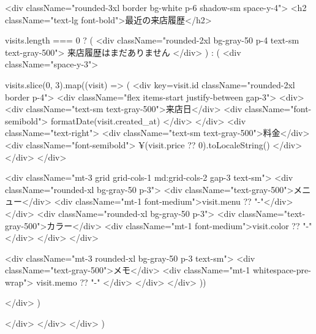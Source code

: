 {        <div className="rounded-3xl border bg-white p-6 shadow-sm space-y-4">
          <h2 className="text-lg font-bold">最近の来店履歴</h2>

          {visits.length === 0 ? (
            <div className="rounded-2xl bg-gray-50 p-4 text-sm text-gray-500">
              来店履歴はまだありません
            </div>
          ) : (
            <div className="space-y-3">
              {visits.slice(0, 3).map((visit) => (
                <div key={visit.id} className="rounded-2xl border p-4">
                  <div className="flex items-start justify-between gap-3">
                    <div>
                      <div className="text-sm text-gray-500">来店日</div>
                      <div className="font-semibold">
                        {formatDate(visit.created_at)}
                      </div>
                    </div>
                    <div className="text-right">
                      <div className="text-sm text-gray-500">料金</div>
                      <div className="font-semibold">
                        ¥{(visit.price ?? 0).toLocaleString()}
                      </div>
                    </div>
                  </div>

                  <div className="mt-3 grid grid-cols-1 md:grid-cols-2 gap-3 text-sm">
                    <div className="rounded-xl bg-gray-50 p-3">
                      <div className="text-gray-500">メニュー</div>
                      <div className="mt-1 font-medium">{visit.menu ?? "-"}</div>
                    </div>
                    <div className="rounded-xl bg-gray-50 p-3">
                      <div className="text-gray-500">カラー</div>
                      <div className="mt-1 font-medium">{visit.color ?? "-"}</div>
                    </div>
                  </div>

                  <div className="mt-3 rounded-xl bg-gray-50 p-3 text-sm">
                    <div className="text-gray-500">メモ</div>
                    <div className="mt-1 whitespace-pre-wrap">
                      {visit.memo ?? "-"}
                    </div>
                  </div>
                </div>
              ))}
            </div>
          )}
        </div>
      </div>
    </div>
  )
}